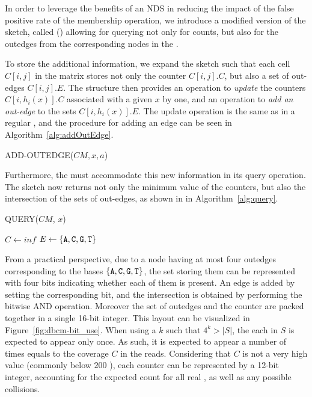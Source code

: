 In order to leverage the benefits of an NDS in reducing the impact of the false positive rate of the membership operation, we introduce a modified version of the \cm sketch, called \keyterm{\dB\cm} (\dBCM) allowing for querying not only for \kmer counts, but also for the outedges from the corresponding nodes in the \dBG.


To store the additional information, we expand the \cm sketch such that each cell $C[i,j]$ in the matrix stores not only the counter $C[i,j].C$, but also a set of out-edges $C[i,j].E$. The structure then provides an operation to \emph{update} the counters $C[i,h_i(x)].C$ associated with a given \kmer $x$ by one, and an operation to \emph{add an out-edge} to the sets $C[i,h_i(x)].E$. The update operation is the same as in a regular \cm, and the procedure for adding an edge can be seen in Algorithm~\ref{alg:addOutEdge}.


\begin{algorithm}[htbp]
    \caption{ADD-OUTEDGE($CM, x, a$)}\label{alg:addOutEdge}
\end{algorithm}

Furthermore, the \dBCM must accommodate this new information in its query operation. The sketch now returns not only the minimum value of the counters, but also the intersection of the sets of out-edges, as shown in in Algorithm~\ref{alg:query}.

\begin{algorithm}
	\caption{QUERY($CM$, $x$)}\label{alg:query}
	$C \gets \mathit{inf}$\;
	$E \gets \{\mathtt{A}, \mathtt{C}, \mathtt{G}, \mathtt{T}\}$\;
\end{algorithm}

From a practical perspective, due to a node having at most four outedges corresponding to the bases $\{\mathtt{A}, \mathtt{C}, \mathtt{G}, \mathtt{T}\}$, the set storing them can be represented with four bits indicating whether each of them is present. An edge is added by setting the corresponding bit, and the intersection is obtained by performing the bitwise AND operation. Moreover the set of outedges and the counter are packed together in a single 16-bit integer. This layout can be visualized in Figure~\ref{fig:dbcm-bit_use}. When using a $k$ such that $4^k > |S|$, the each \kmer in $S$ is expected to appear only once. As such, it is expected to appear a number of times equals to the coverage $C$ in the reads. Considering that $C$ is not a very high value (commonly below $200$ ), each counter can be represented by a 12-bit integer, accounting for the expected count for all real , as well as any possible collisions.

